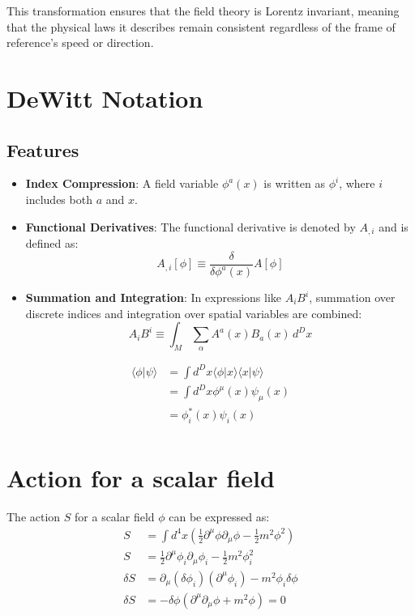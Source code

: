 \documentclass{article}
\begin{document}
This transformation ensures that the field theory is Lorentz invariant, meaning that the physical laws it describes remain consistent regardless of the frame of reference's speed or direction.

\section*{DeWitt Notation}

\subsection*{Features}
\begin{itemize}
    \item \textbf{Index Compression}: A field variable $\phi^a(x)$ is written as $\phi^i$, where $i$ includes both $a$ and $x$.
    
    \item \textbf{Functional Derivatives}: The functional derivative is denoted by $A_{,i}$ and is defined as:
    \[
    A_{,i}[\phi] \equiv \frac{\delta}{\delta \phi^a(x)} A[\phi]
    \]
    
    \item \textbf{Summation and Integration}: In expressions like $A_i B^i$, summation over discrete indices and integration over spatial variables are combined:
    \[
    A_i B^i \equiv \int_M \sum_{\alpha} A^a(x) B_a(x) \, d^D x
    \]
\end{itemize}

\begin{align*}
    \langle \phi | \psi \rangle &= \int d^{D}x \langle \phi | x \rangle \langle x | \psi \rangle \\ 
    &= \int d^D x \phi^\mu(x) \psi_\mu(x)  \\
 &= \phi^{*}_i(x) \psi_i(x)  \\
\end{align*}

\section*{Action for a scalar field}

The action \( S \) for a scalar field \( \phi \) can be expressed as:
\begin{align*}
    S &= \int d^4 x \left( \frac{1}{2} \partial^\mu \phi \partial_\mu \phi - \frac{1}{2} m^2 \phi^2 \right) \\ 
    S  &= \frac{1}{2} \partial^\mu \phi_i \partial_\mu \phi_i - \frac{1}{2} m^2 \phi_{i}^{2} \\ 
    \delta S &= \partial_\mu(\delta \phi_i) (\partial^\mu \phi_i ) - m^2 \phi_i \delta \phi  \\ 
     \delta S &= -\delta \phi \left( \partial^\mu \partial_\mu \phi + m^2 \phi \right) = 0  \\
\end{align*}
\end{document}
